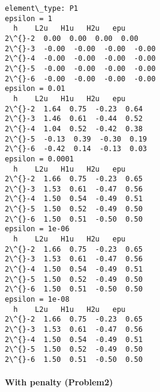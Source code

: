 \documentclass[11pt]{article}
\begin{document}
    \begin{Verbatim}[commandchars=\\\{\}]
element\_type: P1
epsilon = 1
  h    L2u   H1u   H2u   epu
2\^{}-2  0.00  0.00  0.00  0.00
2\^{}-3  -0.00  -0.00  -0.00  -0.00
2\^{}-4  -0.00  -0.00  -0.00  -0.00
2\^{}-5  -0.00  -0.00  -0.00  -0.00
2\^{}-6  -0.00  -0.00  -0.00  -0.00
epsilon = 0.01
  h    L2u   H1u   H2u   epu
2\^{}-2  1.64  0.75  -0.23  0.64
2\^{}-3  1.46  0.61  -0.44  0.52
2\^{}-4  1.04  0.52  -0.42  0.38
2\^{}-5  -0.13  0.39  -0.30  0.19
2\^{}-6  -0.42  0.14  -0.13  0.03
epsilon = 0.0001
  h    L2u   H1u   H2u   epu
2\^{}-2  1.66  0.75  -0.23  0.65
2\^{}-3  1.53  0.61  -0.47  0.56
2\^{}-4  1.50  0.54  -0.49  0.51
2\^{}-5  1.50  0.52  -0.49  0.50
2\^{}-6  1.50  0.51  -0.50  0.50
epsilon = 1e-06
  h    L2u   H1u   H2u   epu
2\^{}-2  1.66  0.75  -0.23  0.65
2\^{}-3  1.53  0.61  -0.47  0.56
2\^{}-4  1.50  0.54  -0.49  0.51
2\^{}-5  1.50  0.52  -0.49  0.50
2\^{}-6  1.50  0.51  -0.50  0.50
epsilon = 1e-08
  h    L2u   H1u   H2u   epu
2\^{}-2  1.66  0.75  -0.23  0.65
2\^{}-3  1.53  0.61  -0.47  0.56
2\^{}-4  1.50  0.54  -0.49  0.51
2\^{}-5  1.50  0.52  -0.49  0.50
2\^{}-6  1.50  0.51  -0.50  0.50
    \end{Verbatim}

    \paragraph{With penalty (Problem2)}\label{with-penalty-problem2}
\end{document}
